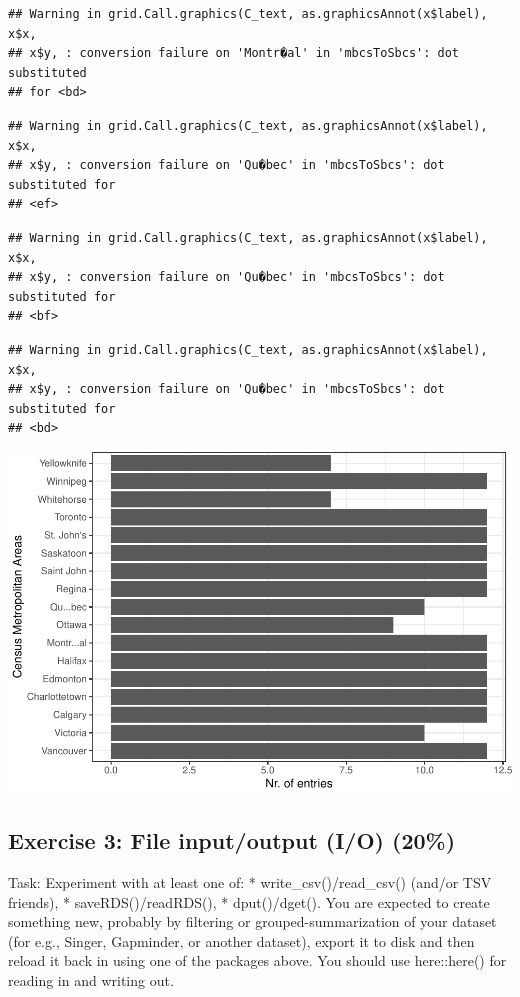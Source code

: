 \documentclass[]{article}
\begin{document}
\begin{verbatim}
## Warning in grid.Call.graphics(C_text, as.graphicsAnnot(x$label), x$x,
## x$y, : conversion failure on 'Montr�al' in 'mbcsToSbcs': dot substituted
## for <bd>
\end{verbatim}

\begin{verbatim}
## Warning in grid.Call.graphics(C_text, as.graphicsAnnot(x$label), x$x,
## x$y, : conversion failure on 'Qu�bec' in 'mbcsToSbcs': dot substituted for
## <ef>
\end{verbatim}

\begin{verbatim}
## Warning in grid.Call.graphics(C_text, as.graphicsAnnot(x$label), x$x,
## x$y, : conversion failure on 'Qu�bec' in 'mbcsToSbcs': dot substituted for
## <bf>
\end{verbatim}

\begin{verbatim}
## Warning in grid.Call.graphics(C_text, as.graphicsAnnot(x$label), x$x,
## x$y, : conversion failure on 'Qu�bec' in 'mbcsToSbcs': dot substituted for
## <bd>
\end{verbatim}

\includegraphics{hw05_files/figure-latex/unnamed-chunk-10-1.pdf}

\hypertarget{exercise-3-file-inputoutput-io-20}{%
\subsection{Exercise 3: File input/output (I/O)
(20\%)}\label{exercise-3-file-inputoutput-io-20}}

Task: Experiment with at least one of: * write\_csv()/read\_csv()
(and/or TSV friends), * saveRDS()/readRDS(), * dput()/dget(). You are
expected to create something new, probably by filtering or
grouped-summarization of your dataset (for e.g., Singer, Gapminder, or
another dataset), export it to disk and then reload it back in using one
of the packages above. You should use here::here() for reading in and
writing out.
\end{document}
